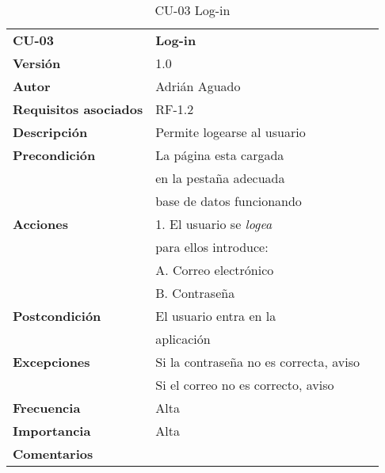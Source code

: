 \begin{table}
\begin{tabular}{llr}  
\toprule
\begin{minipage}[b]{0.24\columnwidth}\raggedright\strut
\textbf{CU-03}\strut
\end{minipage} & \begin{minipage}[b]{0.72\columnwidth}\raggedright\strut
\textbf{Log-in}\strut
\end{minipage}\tabularnewline
\cmidrule(r){1-2}
\textbf{Versión}       & 1.0           \\
\textbf{Autor}       & Adrián  Aguado    \\
\textbf{Requisitos asociados}       & RF-1.2 \\ 
\textbf{Descripción} & Permite logearse al usuario\\
\textbf{Precondición} & La página esta cargada \\
& en la pestaña adecuada     \\
& base de datos funcionando       \\
\textbf{Acciones} & 1. El usuario se \emph{logea}\\
& para ellos introduce:\\
& A. Correo electrónico \\
& B. Contraseña\\
\textbf{Postcondición} & El usuario entra en la  \\
& aplicación    \\
\textbf{Excepciones} &  Si la contraseña no es correcta, aviso \\
&  Si el correo no es correcto, aviso \\
\textbf{Frecuencia} & Alta            \\
\textbf{Importancia} & Alta            \\
\textbf{Comentarios } &        \\
\bottomrule
\end{tabular}
\caption{CU-03 Log-in} 
\end{table}

